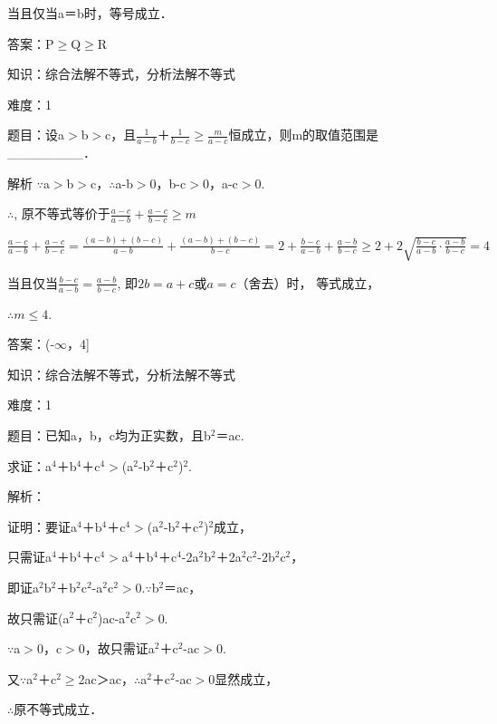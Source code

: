 \documentclass{article} %
\begin{document}
当且仅当a＝b时，等号成立．

 答案：P$\mathrm{\ge}$Q$\mathrm{\ge}$R

 

 知识：综合法解不等式，分析法解不等式

 难度：1

 题目：设a$\mathrm{>}$b$\mathrm{>}$c，且$\frac{1}{a-b}$＋$\frac{1}{b-c}$$\mathrm{\ge}$$\frac{m}{a-c}$恒成立，则m的取值范围是\_\_\_\_\_\_\_\_．

 解析
$\mathrm{\because}$a$\mathrm{>}$b$\mathrm{>}$c，$\mathrm{\therefore}$a-b$\mathrm{>}$0，b-c$\mathrm{>}$0，a-c$\mathrm{>}$0.

$\therefore$, 原不等式等价于$\frac{a-c}{a-b}+\frac{a-c}{b-c}\ge m$

$\frac{a-c}{a-b}+\frac{a-c}{b-c}=\frac{(a-b)+(b-c)}{a-b}+\frac{(a-b)+(b-c)}{b-c}=2+\frac{b-c}{a-b}+\frac{a-b}{b-c}\ge 2+2\sqrt{\frac{b-c}{a-b}\cdot\frac{a-b}{b-c}}=4$

当且仅当$\frac{b-c}{a-b}=\frac{a-b}{b-c}$, 即$2b=a+c$或$a=c$（舍去）时， 等式成立，

$\therefore m\le 4.$

 答案：(-$\mathrm{\infty}$，4]



 知识：综合法解不等式，分析法解不等式

 难度：1

 题目：已知a，b，c均为正实数，且b${}^{2}$＝ac.

 求证：a${}^{4}$＋b${}^{4}$＋c${}^{4}$$\mathrm{>}$(a${}^{2}$-b${}^{2}$＋c${}^{2}$)${}^{2}$.

 解析：

 证明：要证a${}^{4}$＋b${}^{4}$＋c${}^{4}$$\mathrm{>}$(a${}^{2}$-b${}^{2}$＋c${}^{2}$)${}^{2}$成立，

只需证a${}^{4}$＋b${}^{4}$＋c${}^{4}$$\mathrm{>}$a${}^{4}$＋b${}^{4}$＋c${}^{4}$-2a${}^{2}$b${}^{2}$＋2a${}^{2}$c${}^{2}$-2b${}^{2}$c${}^{2}$，

即证a${}^{2}$b${}^{2}$＋b${}^{2}$c${}^{2}$-a${}^{2}$c${}^{2}$$\mathrm{>}$0.$\mathrm{\because}$b${}^{2}$＝ac，

故只需证(a${}^{2}$＋c${}^{2}$)ac-a${}^{2}$c${}^{2}$$\mathrm{>}$0.

$\mathrm{\because}$a$\mathrm{>}$0，c$\mathrm{>}$0，故只需证a${}^{2}$＋c${}^{2}$-ac$\mathrm{>}$0.

又$\mathrm{\because}$a${}^{2}$＋c${}^{2}$$\mathrm{\ge}$2ac＞ac，$\mathrm{\therefore}$a${}^{2}$＋c${}^{2}$-ac$\mathrm{>}$0显然成立，

$\mathrm{\therefore}$原不等式成立．
\end{document}
